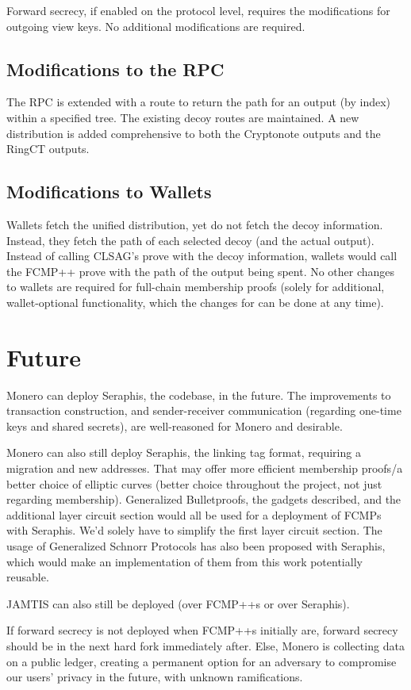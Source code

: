 \documentclass[]{article}
\begin{document}
Forward secrecy, if enabled on the protocol level, requires the modifications for outgoing view keys. No additional modifications are required.

\subsection{Modifications to the RPC}

The RPC is extended with a route to return the path for an output (by index) within a specified tree. The existing decoy routes are maintained. A new distribution is added comprehensive to both the Cryptonote outputs and the RingCT outputs.

\subsection{Modifications to Wallets}

Wallets fetch the unified distribution, yet do not fetch the decoy information. Instead, they fetch the path of each selected decoy (and the actual output). Instead of calling CLSAG's prove with the decoy information, wallets would call the FCMP++ prove with the path of the output being spent. No other changes to wallets are required for full-chain membership proofs (solely for additional, wallet-optional functionality, which the changes for can be done at any time).

\section{Future}

Monero can deploy Seraphis, the codebase, in the future. The improvements to transaction construction, and sender-receiver communication (regarding one-time keys and shared secrets), are well-reasoned for Monero and desirable.

Monero can also still deploy Seraphis, the linking tag format, requiring a migration and new addresses. That may offer more efficient membership proofs/a better choice of elliptic curves (better choice throughout the project, not just regarding membership). Generalized Bulletproofs, the gadgets described, and the additional layer circuit section would all be used for a deployment of FCMPs with Seraphis. We'd solely have to simplify the first layer circuit section. The usage of Generalized Schnorr Protocols has also been proposed with Seraphis, which would make an implementation of them from this work potentially reusable.

JAMTIS can also still be deployed (over FCMP++s or over Seraphis).

If forward secrecy is not deployed when FCMP++s initially are, forward secrecy should be in the next hard fork immediately after. Else, Monero is collecting data on a public ledger, creating a permanent option for an adversary to compromise our users' privacy in the future, with unknown ramifications.
\end{document}
